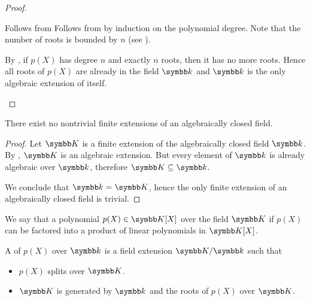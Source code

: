 \begin{proof}
\begin{description}
     Follows from  Follows from  by induction on the polynomial degree. Note that the number of roots is bounded by \( n \) (see ).

     By , if \( p(X) \) has degree \( n \) and exactly \( n \) roots, then it has no more roots. Hence all roots of \( p(X) \) are already in the field \( \Bk \) and \( \Bk \) is the only algebraic extension of itself.
  \end{description}
\end{proof}

\begin{proposition}\label{thm:no_finite_extensions_of_closed_fields}
  There exist no nontrivial finite extensions of an algebraically closed field.
\end{proposition}
\begin{proof}
  Let \( \BK \) is a finite extension of the algebraically closed field \( \Bk \). By , \( \BK \) is an algebraic extension. But every element of \( \Bk \) is already algebraic over \( \Bk \), therefore \( \BK \subseteq \Bk \).

  We conclude that \( \Bk = \BK \), hence the only finite extension of an algebraically closed field is trivial.
\end{proof}

\begin{definition}\label{def:splitting_field}\cite[458]{Knapp2016BAlg}
  We say that a polynomial \( p(X) \in \BK[X] \) over the field \( \BK \)  if \( p(X) \) can be factored into a product of linear polynomials in \( \BK[X] \).

  A  of \( p(X) \) over \( \Bk \) is a field extension \( \BK / \Bk \) such that
  \begin{itemize}
    \item \( p(X) \) splits over \( \BK \).
    \item \( \BK \) is generated by \( \Bk \) and the roots of \( p(X) \) over \( \BK \).
  \end{itemize}
\end{definition}

